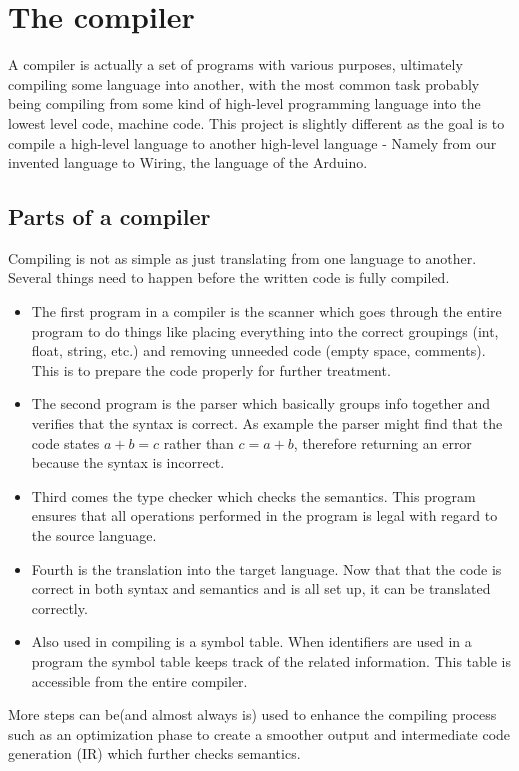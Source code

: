 \section{The compiler}
A compiler is actually a set of programs with various purposes, ultimately compiling some language into another, with the most common task probably being compiling from some kind of high-level programming language into the lowest level code, machine code. This project is slightly different as the goal is to compile a high-level language to another high-level language - Namely from our invented language to Wiring, the language of the Arduino.
\subsection{Parts of a compiler}
Compiling is not as simple as just translating from one language to another. Several things need to happen before the written code is fully compiled.\cite{compiler:structure}\\

\begin{itemize}
	\item The first program in a compiler is the scanner which goes through the entire program to do things like placing everything into the correct groupings (int, float, string, etc.) and removing unneeded code (empty space, comments). This is to prepare the code properly for further treatment.
	\item The second program is the parser which basically groups info together and verifies that the syntax is correct. As example the parser might find that the code states $a + b = c$ rather than $c = a + b$, therefore returning an error because the syntax is incorrect.

	\item Third comes the type checker which checks the semantics. This program ensures that all operations performed in the program is legal with regard to the source language.

	\item Fourth is the translation into the target language. Now that that the code is correct in both syntax and semantics and is all set up, it can be translated correctly.

	\item Also used in compiling is a symbol table. When identifiers are used in a program the symbol table keeps track of the related information. This table is accessible from the entire compiler.
\end{itemize}

More steps can be(and almost always is) used to enhance the compiling process such as an optimization phase to create a smoother output and intermediate code generation (IR) which further checks semantics.